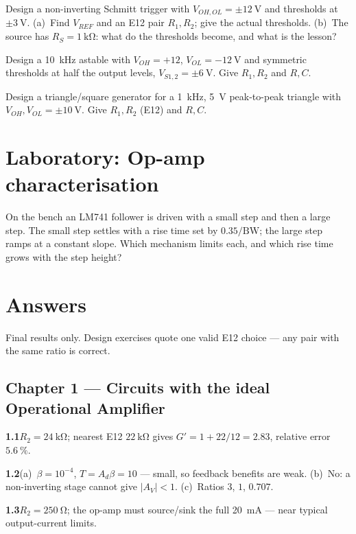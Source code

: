 \documentclass[11pt,a4paper,oneside]{book}
\newcommand{\op}{op-amp}
\newcommand{\Ad}{A_d}
\newcommand{\ans}[1]{\par\smallskip\noindent\textbf{#1}\quad\ignorespaces}
\begin{document}
\begin{exercise}
Design a non-inverting Schmitt trigger with $V_{OH,OL}=\pm\qty{12}{\volt}$ and
thresholds at $\pm\qty{3}{\volt}$.
(a)~Find $V_{REF}$ and an E12 pair $R_1,R_2$; give the actual thresholds.
(b)~The source has $R_S=\qty{1}{\kilo\ohm}$: what do the thresholds become, and
what is the lesson?
\end{exercise}

\begin{exercise}
Design a \qty{10}{\kilo\hertz} astable with $V_{OH}=+12$, $V_{OL}=\qty{-12}{\volt}$
and symmetric thresholds at half the output levels, $V_{S1,2}=\pm\qty{6}{\volt}$.
Give $R_1,R_2$ and $R,C$.
\end{exercise}

\begin{exercise}
Design a triangle/square generator for a \qty{1}{\kilo\hertz}, \qty{5}{\volt}
peak-to-peak triangle with $V_{OH},V_{OL}=\pm\qty{10}{\volt}$. Give $R_1,R_2$
(E12) and $R,C$.
\end{exercise}

\chapter{Laboratory: Op-amp characterisation}

\begin{exercise}
On the bench an LM741 follower is driven with a small step and then a large step.
The small step settles with a rise time set by $0.35/\text{BW}$; the large step
ramps at a constant slope. Which mechanism limits each, and which rise time grows
with the step height?
\end{exercise}

\chapter{Answers}\label{ch:answers}

Final results only. Design exercises quote one valid E12 choice --- any pair with
the same ratio is correct.

\section*{Chapter 1 --- Circuits with the ideal Operational Amplifier}
\ans{1.1}$R_2=\qty{24}{\kilo\ohm}$; nearest E12 $\qty{22}{\kilo\ohm}$ gives
$G'=1+22/12=2.83$, relative error $\qty{5.6}{\percent}$.
\ans{1.2}(a)~$\beta=10^{-4}$, $T=\Ad\beta=10$ --- small, so feedback benefits are
weak. (b)~No: a non-inverting stage cannot give $|A_V|<1$. (c)~Ratios $3$, $1$,
$0.707$.
\ans{1.3}$R_2=\qty{250}{\ohm}$; the \op{} must source/sink the full
\qty{20}{\milli\ampere} --- near typical output-current limits.
\end{document}
